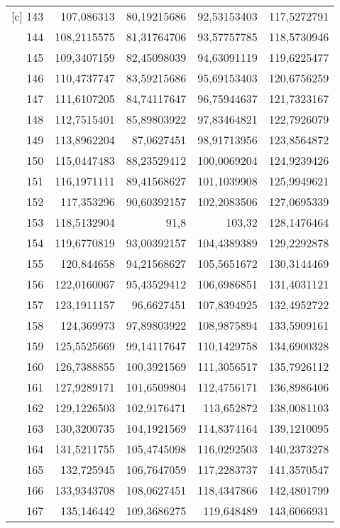 \begin{longtable}{r|rrrr}[c]
    143   & 107,086313 & 80,19215686 & 92,53153403 & 117,5272791 \\
    144   & 108,2115575 & 81,31764706 & 93,57757785 & 118,5730946 \\
    145   & 109,3407159 & 82,45098039 & 94,63091119 & 119,6225477 \\
    146   & 110,4737747 & 83,59215686 & 95,69153403 & 120,6756259 \\
    147   & 111,6107205 & 84,74117647 & 96,75944637 & 121,7323167 \\
    148   & 112,7515401 & 85,89803922 & 97,83464821 & 122,7926079 \\
    149   & 113,8962204 & 87,0627451 & 98,91713956 & 123,8564872 \\
    150   & 115,0447483 & 88,23529412 & 100,0069204 & 124,9239426 \\
    151   & 116,1971111 & 89,41568627 & 101,1039908 & 125,9949621 \\
    152   & 117,353296 & 90,60392157 & 102,2083506 & 127,0695339 \\
    153   & 118,5132904 & 91,8  & 103,32 & 128,1476464 \\
    154   & 119,6770819 & 93,00392157 & 104,4389389 & 129,2292878 \\
    155   & 120,844658 & 94,21568627 & 105,5651672 & 130,3144469 \\
    156   & 122,0160067 & 95,43529412 & 106,6986851 & 131,4031121 \\
    157   & 123,1911157 & 96,6627451 & 107,8394925 & 132,4952722 \\
    158   & 124,369973 & 97,89803922 & 108,9875894 & 133,5909161 \\
    159   & 125,5525669 & 99,14117647 & 110,1429758 & 134,6900328 \\
    160   & 126,7388855 & 100,3921569 & 111,3056517 & 135,7926112 \\
    161   & 127,9289171 & 101,6509804 & 112,4756171 & 136,8986406 \\
    162   & 129,1226503 & 102,9176471 & 113,652872 & 138,0081103 \\
    163   & 130,3200735 & 104,1921569 & 114,8374164 & 139,1210095 \\
    164   & 131,5211755 & 105,4745098 & 116,0292503 & 140,2373278 \\
    165   & 132,725945 & 106,7647059 & 117,2283737 & 141,3570547 \\
    166   & 133,9343708 & 108,0627451 & 118,4347866 & 142,4801799 \\
    167   & 135,146442 & 109,3686275 & 119,648489 & 143,6066931 \\

\end{longtable}
